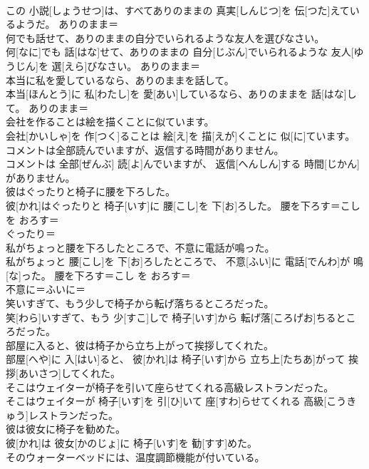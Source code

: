 \documentclass[8pt]{extreport}
\begin{document}
\begin{CJK}{UTF8}{min}
\\	この 小説[しょうせつ]は、すべてありのままの 真実[しんじつ]を 伝[つた]えているようだ。	ありのまま＝ 
\\	何でも話せて、ありのままの自分でいられるような友人を選びなさい。	
\\	何[なに]でも 話[はな]せて、ありのままの 自分[じぶん]でいられるような 友人[ゆうじん]を 選[えら]びなさい。	ありのまま＝ 
\\	本当に私を愛しているなら、ありのままを話して。	
\\	本当[ほんとう]に 私[わたし]を 愛[あい]しているなら、ありのままを 話[はな]して。	ありのまま＝ 
\\	会社を作ることは絵を描くことに似ています。	
\\	会社[かいしゃ]を 作[つく]ることは 絵[え]を 描[えが]くことに 似[に]ています。	
\\	コメントは全部読んでいますが、返信する時間がありません。	
\\	コメントは 全部[ぜんぶ] 読[よ]んでいますが、 返信[へんしん]する 時間[じかん]がありません。	
\\	彼はぐったりと椅子に腰を下ろした。	
\\	彼[かれ]はぐったりと 椅子[いす]に 腰[こし]を 下[お]ろした。	腰を下ろす＝こし を おろす＝ 
\\	ぐったり＝ 
\\	私がちょっと腰を下ろしたところで、不意に電話が鳴った。	
\\	私がちょっと 腰[こし]を 下[お]ろしたところで、 不意[ふい]に 電話[でんわ]が 鳴[な]った。	腰を下ろす＝こし を おろす＝ 
\\	不意に＝ふいに＝ 
\\	笑いすぎて、もう少しで椅子から転げ落ちるところだった。	
\\	笑[わら]いすぎて、もう 少[すこ]しで 椅子[いす]から 転げ落[ころげお]ちるところだった。	
\\	部屋に入ると、彼は椅子から立ち上がって挨拶してくれた。	
\\	部屋[へや]に 入[はい]ると、 彼[かれ]は 椅子[いす]から 立ち上[たちあ]がって 挨拶[あいさつ]してくれた。	
\\	そこはウェイターが椅子を引いて座らせてくれる高級レストランだった。	
\\	そこはウェイターが 椅子[いす]を 引[ひ]いて 座[すわ]らせてくれる 高級[こうきゅう]レストランだった。	
\\	彼は彼女に椅子を勧めた。	
\\	彼[かれ]は 彼女[かのじょ]に 椅子[いす]を 勧[すす]めた。	
\\	そのウォーターベッドには、温度調節機能が付いている。	

\end{CJK}
\end{document}
